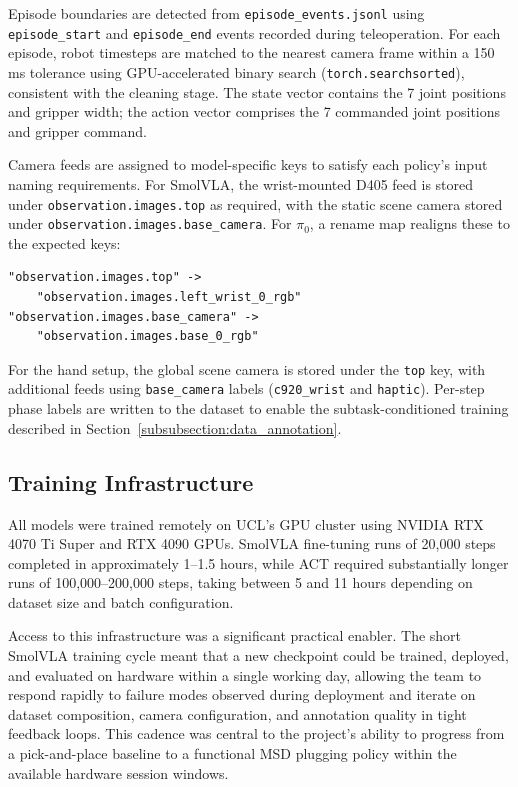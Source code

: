 \documentclass[conference]{IEEEtran}
\begin{document}
Episode boundaries are detected from \texttt{episode\_events.jsonl} using \texttt{episode\_start} and \texttt{episode\_end} events recorded during teleoperation. For each episode, robot timesteps are matched to the nearest camera frame within a 150\,ms tolerance using GPU-accelerated binary search (\texttt{torch.searchsorted}), consistent with the cleaning stage. The state vector contains the 7 joint positions and gripper width; the action vector comprises the 7 commanded joint positions and gripper command.

Camera feeds are assigned to model-specific keys to satisfy each policy's input naming requirements. For SmolVLA, the wrist-mounted D405 feed is stored under \texttt{observation.images.top} as required, with the static scene camera stored under \texttt{observation.images.base\_camera}. For $\pi_0$, a rename map realigns these to the expected keys:

\begin{verbatim}
"observation.images.top" ->
    "observation.images.left_wrist_0_rgb"
"observation.images.base_camera" ->
    "observation.images.base_0_rgb"
\end{verbatim}

For the hand setup, the global scene camera is stored under the \texttt{top} key, with additional feeds using \texttt{base\_camera} labels (\texttt{c920\_wrist} and \texttt{haptic}). Per-step phase labels are written to the dataset to enable the subtask-conditioned training described in Section~\ref{subsubsection:data_annotation}.

\subsection{Training Infrastructure}

All models were trained remotely on UCL's GPU cluster using NVIDIA RTX 4070 Ti Super and RTX 4090 GPUs. SmolVLA fine-tuning runs of 20{,}000 steps completed in approximately 1--1.5 hours, while ACT required substantially longer runs of 100{,}000--200{,}000 steps, taking between 5 and 11 hours depending on dataset size and batch configuration.

Access to this infrastructure was a significant practical enabler. The short SmolVLA training cycle meant that a new checkpoint could be trained, deployed, and evaluated on hardware within a single working day, allowing the team to respond rapidly to failure modes observed during deployment and iterate on dataset composition, camera configuration, and annotation quality in tight feedback loops. This cadence was central to the project's ability to progress from a pick-and-place baseline to a functional MSD plugging policy within the available hardware session windows.
\end{document}
